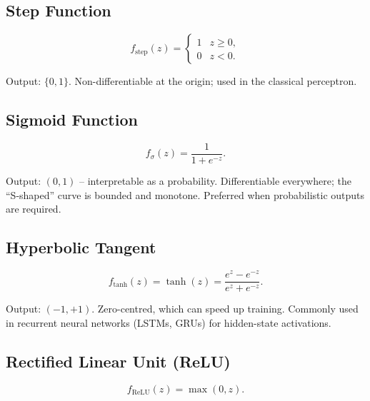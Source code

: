 \documentclass[12pt,a4paper]{article}
\begin{document}
\subsection{Step Function}
\label{subsec:step}

\begin{equation}
  \label{eq:step-fn}
  f_{\text{step}}(z) =
  \begin{cases}
    1 & z \geq 0, \\
    0 & z < 0.
  \end{cases}
\end{equation}

Output: $\{0, 1\}$.  Non-differentiable at the origin; used in the
classical perceptron.

\subsection{Sigmoid Function}
\label{subsec:sigmoid}

\begin{equation}
  \label{eq:sigmoid}
  f_{\sigma}(z) = \frac{1}{1 + e^{-z}}.
\end{equation}

Output: $(0, 1)$ -- interpretable as a probability.  Differentiable
everywhere; the ``S-shaped'' curve is bounded and monotone.  Preferred
when probabilistic outputs are required.

\subsection{Hyperbolic Tangent}
\label{subsec:tanh}

\begin{equation}
  \label{eq:tanh}
  f_{\tanh}(z) = \tanh(z) = \frac{e^{z} - e^{-z}}{e^{z} + e^{-z}}.
\end{equation}

Output: $(-1, +1)$.  Zero-centred, which can speed up training.
Commonly used in recurrent neural networks (LSTMs, GRUs) for hidden-state
activations.

\subsection{Rectified Linear Unit (ReLU)}
\label{subsec:relu}

\begin{equation}
  \label{eq:relu}
  f_{\text{ReLU}}(z) = \max(0, z).
\end{equation}
\end{document}
